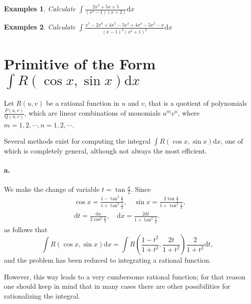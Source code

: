 \documentclass[a4paper,12pt]{article} %
\newtheorem{example}{Examples}
\begin{document}
\begin{example}
    \normalfont
    Calculate $\displaystyle\int \frac{2x^2 + 5x + 5}{(x^2 - 1)(x + 2)}\mathrm{d}x$
\end{example}

\begin{example}
    \normalfont 
    Calculate $\displaystyle \int \frac{x^7 - 2x^6 + 4x^5 - 5x^4 + 4x^3 - 5x^2 - x}
    {(x - 1)^2(x^2 + 1)^2}\mathrm{d}x$
\end{example}

\section{Primitive of the Form $\displaystyle \int R(\cos x, \sin x)\mathrm{d}x$}
Let $R(u,v)$ be a rational function in $u$ and $v$, that is a quotient of polynomials 
$\displaystyle \frac{P(u,v)}{Q(u,v)}$, which are linear combinations of monomials 
$u^mv^n$, where $m = 1,2,\cdots, n=1,2,\cdots$.

Several methods exist for computing the integral $\displaystyle \int R(\cos x, \sin x)
\mathrm{d}x$, one of which is completely general, although not always the most efficient.
\paragraph{\rm \textbf{a.}} We make the change of variable $t = \tan\frac{x}{2}$. Since 
\[
    \begin{split}
        &\cos x = \frac{1 - \tan^2\frac{x}{2}}{1 + \tan^2\frac{x}{2}},\quad
    \sin x = \frac{2\tan \frac{x}{2}}{1 + \tan^2\frac{x}{2}},\\
        &\mathrm{d}t = \frac{\mathrm{d}x}{2\cos^2\frac{x}{2}},\quad
    \mathrm{d}x = \frac{2\mathrm{d}t}{1 + \tan^2\frac{x}{2}}.
    \end{split}
    \]
as follows that 
\[
    \int R(\cos x, \sin x)\mathrm{d}x = \int R\left(\frac{1-t^2}{1+t^2},\frac{2t}{1+t^2}\right)
    \frac{2}{1+t^2}\mathrm{d}t,
    \]
and the problem has been reduced to integrating a rational function.

However, this way leads to a very cumbersome rational function; for 
that reason one should keep in mind that in many cases there are other 
possibilities for rationalizing the integral.
\end{document}
